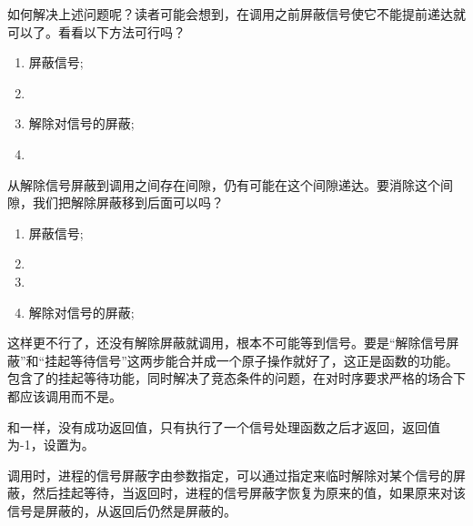 如何解决上述问题呢？读者可能会想到，在调用之前屏蔽信号使它不能提前递达就可以了。看看以下方法可行吗？


\begin{enumerate}

\item 屏蔽信号;

\item {}

\item 解除对信号的屏蔽;

\item {}
\end{enumerate}


从解除信号屏蔽到调用之间存在间隙，仍有可能在这个间隙递达。要消除这个间隙，我们把解除屏蔽移到后面可以吗？


\begin{enumerate}

\item 屏蔽信号;

\item {}

\item {}

\item 解除对信号的屏蔽;
\end{enumerate}


这样更不行了，还没有解除屏蔽就调用，根本不可能等到信号。要是“解除信号屏蔽”和“挂起等待信号”这两步能合并成一个原子操作就好了，这正是函数的功能。包含了的挂起等待功能，同时解决了竞态条件的问题，在对时序要求严格的场合下都应该调用而不是。




和一样，没有成功返回值，只有执行了一个信号处理函数之后才返回，返回值为-1，设置为。



调用时，进程的信号屏蔽字由参数指定，可以通过指定来临时解除对某个信号的屏蔽，然后挂起等待，当返回时，进程的信号屏蔽字恢复为原来的值，如果原来对该信号是屏蔽的，从返回后仍然是屏蔽的。



